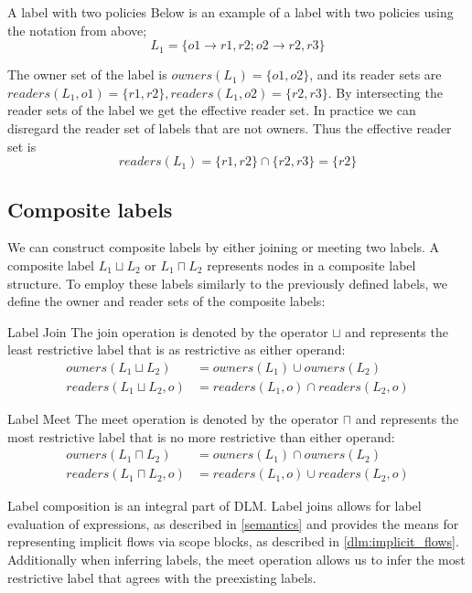 \begin{example}{A label with two policies}\label{dlm:ex:simple_label}
  Below is an example of a label with two policies using the notation from above;
  $$L_1 = \{o1 \rightarrow r1, r2; o2 \rightarrow r2, r3\}$$

  The owner set of the label is $owners(L_1) = \{o1, o2\}$, and its reader sets are $readers(L_1, o1) = \{r1, r2\}, readers(L_1, o2) = \{r2, r3\}$.
  By intersecting the reader sets of the label we get the effective reader set.
  In practice we can disregard the reader set of labels that are not owners.
  Thus the effective reader set is
  $$readers(L_1) = \{r1,r2\} \cap \{r2, r3\} = \{r2\}$$
\end{example}

\subsection{Composite labels}
We can construct composite labels by either joining or meeting two labels.
A composite label $L_1 \sqcup L_2$ or $L_1 \sqcap L_2$ represents nodes in a composite label structure.
To employ these labels similarly to the previously defined labels, we define the owner and reader sets of the composite labels:

\begin{definition}{Label Join}
The join operation is denoted by the operator $\sqcup$ and represents the least restrictive label that is as restrictive as either operand:
  \begin{align*}
    owners(L_1 \sqcup L_2) &= owners(L_1) \cup owners(L_2) \\
    readers(L_1 \sqcup L_2, o) &= readers(L_1, o) \cap readers(L_2, o)
  \end{align*}
\end{definition}
\begin{definition}{Label Meet}
The meet operation is denoted by the operator $\sqcap$ and represents the most restrictive label that is no more restrictive than either operand:
  \begin{align*}
    owners(L_1 \sqcap L_2) &= owners(L_1) \cap owners(L_2) \\
    readers(L_1 \sqcap L_2, o) &= readers(L_1, o) \cup readers(L_2, o)
  \end{align*}
\end{definition}

Label composition is an integral part of DLM.
Label joins allows for label evaluation of expressions, as described in \cref{semantics} and provides the means for representing implicit flows via scope blocks, as described in \cref{dlm:implicit_flows}.
Additionally when inferring labels, the meet operation allows us to infer the most restrictive label that agrees with the preexisting labels.

